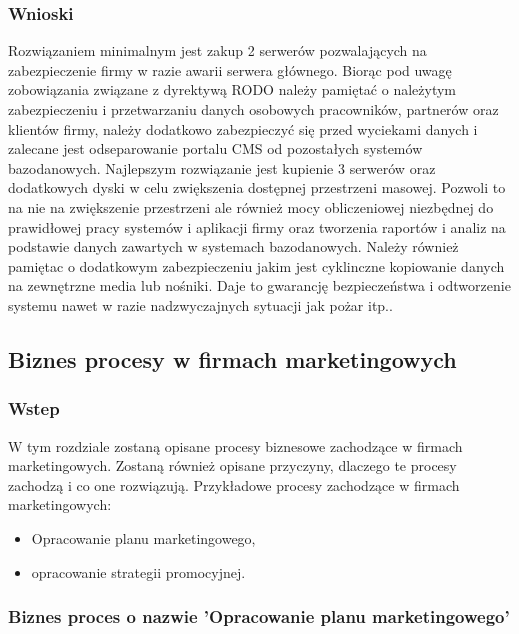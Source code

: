 \documentclass[a4paper, 12pt]{article}
\begin{document}
\subsubsection{Wnioski} 
	\hspace*{1cm} Rozwiązaniem minimalnym jest zakup 2 serwerów pozwalających na zabezpieczenie firmy w razie awarii serwera głównego. Biorąc pod uwagę zobowiązania związane z dyrektywą RODO należy pamiętać o należytym zabezpieczeniu i przetwarzaniu danych osobowych pracowników, partnerów oraz klientów firmy, należy dodatkowo zabezpieczyć się przed wyciekami danych i zalecane jest odseparowanie portalu CMS od pozostałych systemów bazodanowych. Najlepszym rozwiązanie jest kupienie 3 serwerów oraz dodatkowych dyski w celu zwiększenia dostępnej przestrzeni masowej. Pozwoli to na nie na zwiększenie przestrzeni ale również mocy obliczeniowej niezbędnej do prawidłowej pracy systemów i aplikacji firmy oraz tworzenia raportów i analiz na podstawie danych zawartych w systemach bazodanowych. Należy również pamiętac o dodatkowym zabezpieczeniu jakim jest cyklinczne kopiowanie danych na zewnętrzne media lub nośniki. Daje to gwarancję bezpieczeństwa i odtworzenie systemu nawet w razie nadzwyczajnych sytuacji jak pożar itp..

\subsection{Biznes procesy w firmach marketingowych}
\subsubsection{Wstep}
\hspace*{1 cm} W tym rozdziale zostaną opisane procesy biznesowe zachodzące w firmach marketingowych. Zostaną również opisane przyczyny, dlaczego te procesy zachodzą i co one rozwiązują. Przykładowe procesy zachodzące w firmach marketingowych:
\begin{itemize}
	\item Opracowanie planu marketingowego,
	\item opracowanie strategii promocyjnej.
\end{itemize}
\subsubsection{Biznes proces o nazwie 'Opracowanie planu marketingowego'}
\end{document}
